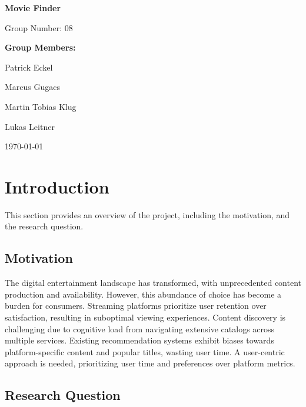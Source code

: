 \documentclass[12pt,a4paper]{article}
\begin{document}
  \begin{titlepage}
    \begin{center}
      \vspace*{2cm}
      {\huge\bfseries Movie Finder\par}
      \vspace{2cm}
      {\Large Group Number: 08\par}
      \vspace{1.5cm}
      {\large\bfseries Group Members:\par}
      \vspace{0.5cm}
      {\large
      Patrick Eckel\par
      Marcus Gugacs\par
      Martin Tobias Klug\par
      Lukas Leitner\par
      }
      \vfill
      {\large \today\par}
    \end{center}
  \end{titlepage}

  \tableofcontents
  \newpage


  \section{Introduction}

  This section provides an overview of the project, including the motivation, and the research question.

  \subsection{Motivation}

  The digital entertainment landscape has transformed, with unprecedented content production and availability.
  However, this abundance of choice has become a burden for consumers.
  Streaming platforms prioritize user retention
  over satisfaction, resulting in suboptimal viewing experiences.
  Content discovery is challenging due to cognitive load from navigating extensive catalogs across multiple services.
  Existing recommendation systems exhibit biases towards platform-specific content and popular titles, wasting user time.
  A user-centric approach is needed, prioritizing user time and preferences over platform metrics.

  \subsection{Research Question}
\end{document}

